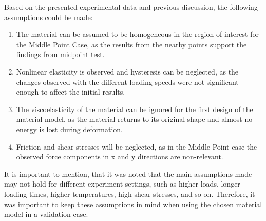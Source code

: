 Based on the presented experimental data and previous discussion, the following assumptions could be made:
\begin{enumerate}
    \item The material can be assumed to be homogeneous in the region of interest for the Middle Point Case, as the results from the nearby points support the findings from midpoint test.
    \item Nonlinear elasticity is observed and hysteresis can be neglected, as the changes observed with the different loading speeds were not significant enough to affect the initial results.
    \item The viscoelasticity of the material can be ignored for the first design of the material model, as the material returns to its original shape and almost no energy is lost during deformation. 
    \item Friction and shear stresses will be neglected, as in the Middle Point case the observed force components in x and y directions are non-relevant.
\end{enumerate}

It is important to mention, that it was noted that the main assumptions made may not hold for different 
experiment settings, such as higher loads, longer loading times, higher temperatures, high shear stresses, and so on. 
Therefore, it was important to keep these assumptions in mind when using the chosen material model in a validation case.  

